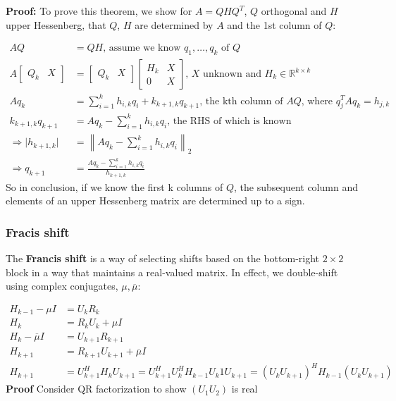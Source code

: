 \documentclass{article}
\newcommand{\norm}[2]{\left\lVert#1\right\rVert_#2}
\newcommand{\abs}[1]{\lvert#1\rvert}
\begin{document}
\textbf{Proof:} To prove this theorem, we show for $A = QHQ^T$, $Q$ orthogonal and $H$ upper Hessenberg, that $Q$, $H$ are determined by $A$ and the 1st column of $Q$:

\begin{align*}
    AQ & = QH \textrm{, assume we know } q_1, \dots, q_k \textrm{ of } Q \\
    A \begin{bmatrix} Q_k & X \end{bmatrix} &= 
        \begin{bmatrix} Q_k & X \end{bmatrix} 
        \begin{bmatrix} H_k & X \\ 0 & X \end{bmatrix} \textrm{, $X$ unknown and } H_k \in \mathbb{R}^{k \times k}\\
    Aq_k &= \sum_{i=1}^kh_{i,k}q_i + k_{k+1,k}q_{k+1} \textrm{, the kth column of $AQ$, where } q_j^TAq_k = h_{j,k}\\
    k_{k+1,k}q_{k+1} &= Aq_k - \sum_{i=1}^kh_{i,k}q_i \textrm{, the RHS of which is known}\\
    \Rightarrow \abs{h_{k+1,k}} &= \norm{Aq_k - \sum_{i=1}^kh_{i,k}q_i}{2}\\
    \Rightarrow q_{k+1} &= \frac{Aq_k - \sum_{i=1}^kh_{i,k}q_i}{h_{k+1,k}}
\end{align*}
So in conclusion, if we know the first k columns of $Q$, the subsequent column and elements of an upper Hessenberg matrix are determined up to a sign.


\subsubsection{Fracis shift}
The \textbf{Francis shift} is a way of selecting shifts based on the bottom-right $2\times 2$ block in a way that maintains a real-valued matrix. In effect, we double-shift using complex conjugates, $\mu, \overline{\mu}$:

\begin{align*}
    H_{k-1} - \mu I &= U_kR_k\\
    H_k &= R_kU_k + \mu I\\
    H_k - \overline{\mu}I &= U_{k+1}R_{k+1}\\
    H_{k+1} &= R_{k+1}U_{k+1} + \overline{\mu}I\\
    H_{k+1} &= U^H_{k+1}H_kU_{k+1} = U^H_{k+1}U^H_kH_{k-1}U_k1U_{k+1} = (U_kU_{k+1})^HH_{k-1}(U_kU_{k+1})
\end{align*}
\textbf{Proof} Consider QR factorization to show $(U_1U_2)$ is real
\end{document}

